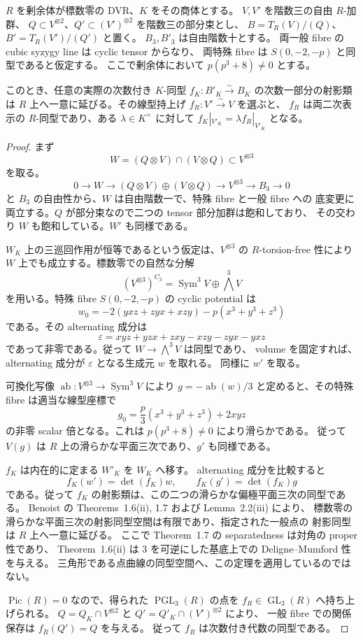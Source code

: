 \begin{lemma}
\label{lem:nfm-boundary-potential-isom-extension}
$R$ を剰余体が標数零の DVR、$K$ をその商体とする。
$V,V'$ を階数三の自由 $R$-加群、
$Q\subset V^{\otimes2}$、$Q'\subset(V')^{\otimes2}$ を階数三の部分束とし、
$B=T_R(V)/(Q)$、$B'=T_R(V')/(Q')$ と置く。
$B_3,B'_3$ は自由階数十とする。
両一般 fibre の cubic syzygy line は cyclic tensor からなり、
両特殊 fibre は $S(0,-2,-p)$ と同型であると仮定する。
ここで剰余体において $p(p^3+8)\ne0$ とする。

このとき、任意の実際の次数付き $K$-同型
$f_K:B'_K\xrightarrow{\sim}B_K$ の次数一部分の射影類は
$R$ 上へ一意に延びる。その線型持上げ $f_R:V'\xrightarrow{\sim}V$ を選ぶと、
$f_R$ は両二次表示の $R$-同型であり、ある $\lambda\in K^\times$ に対して
$f_K|_{V'_K}=\lambda f_R|_{V'_K}$ となる。
\end{lemma}
\begin{proof}
まず
\[
 W=(Q\otimes V)\cap(V\otimes Q)\subset V^{\otimes3}
\]
を取る。
\[
 0\to W\to(Q\otimes V)\oplus(V\otimes Q)
   \to V^{\otimes3}\to B_3\to0
\]
と $B_3$ の自由性から、$W$ は自由階数一で、特殊 fibre と一般 fibre への
底変更に両立する。$Q$ が部分束なので二つの tensor 部分加群は飽和しており、
その交わり $W$ も飽和している。$W'$ も同様である。

$W_K$ 上の三巡回作用が恒等であるという仮定は、$V^{\otimes3}$ の
$R$-torsion-free 性により $W$ 上でも成立する。標数零での自然な分解
\[
 (V^{\otimes3})^{C_3}=\operatorname{Sym}^3V\oplus\bigwedge^3V
\]
を用いる。特殊 fibre $S(0,-2,-p)$ の cyclic potential は
\[
 w_0=-2(yxz+zyx+xzy)-p(x^3+y^3+z^3)
\]
である。その alternating 成分は
\[
 \varepsilon=xyz+yzx+zxy-xzy-zyx-yxz
\]
であって非零である。従って $W\to\bigwedge^3V$ は同型であり、
volume を固定すれば、alternating 成分が $\varepsilon$ となる生成元 $w$ を取れる。
同様に $w'$ を取る。

可換化写像 $\operatorname{ab}:V^{\otimes3}\to\operatorname{Sym}^3V$ により
$g=-\operatorname{ab}(w)/3$ と定めると、その特殊 fibre は適当な線型座標で
\[
 g_0=\frac p3(x^3+y^3+z^3)+2xyz
\]
の非零 scalar 倍となる。これは $p(p^3+8)\ne0$ により滑らかである。
従って $V(g)$ は $R$ 上の滑らかな平面三次であり、$g'$ も同様である。

$f_K$ は内在的に定まる $W'_K$ を $W_K$ へ移す。
alternating 成分を比較すると
\[
 f_K(w')=\det(f_K)w,\qquad f_K(g')=\det(f_K)g
\]
である。従って $f_K$ の射影類は、この二つの滑らかな偏極平面三次の同型である。
Benoist の Theorems~1.6(ii), 1.7 および Lemma~2.2(iii)
\cite[pp.~140--141]{NFMBenoistSeparation} により、
標数零の滑らかな平面三次の射影同型空間は有限であり、指定された一般点の
射影同型は $R$ 上へ一意に延びる。
ここで Theorem~1.7 の separatedness は対角の proper 性であり、
Theorem~1.6(ii) は $3$ を可逆にした基底上での Deligne--Mumford 性を与える。
三角形である点曲線の同型空間へ、この定理を適用しているのではない。

$\operatorname{Pic}(R)=0$ なので、得られた $\operatorname{PGL}_3(R)$ の点を
$f_R\in\operatorname{GL}_3(R)$ へ持ち上げられる。
$Q=Q_K\cap V^{\otimes2}$ と $Q'=Q'_K\cap(V')^{\otimes2}$ により、
一般 fibre での関係保存は $f_R(Q')=Q$ を与える。
従って $f_R$ は次数付き代数の同型である。
\end{proof}

